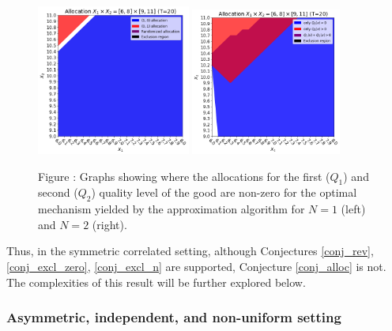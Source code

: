 \documentclass{article}
\newcounter{fig}
\begin{document}
\begin{figure}[H]
    \begin{center}
    \includegraphics[width=0.45\textwidth]{images/belloni_alloc_n1.png}
    \includegraphics[width=0.44\textwidth]{images/belloni_alloc_n2.png}
    \end{center}
    
    \vspace{1mm}
    \raggedright{\small {\sc Figure \thefig\label{fig:belloni_alloc_alln}:} Graphs showing where the allocations for the first ($Q_1$) and second ($Q_2$) quality level of the good are non-zero for the optimal mechanism yielded by the approximation algorithm for $N=1$ (left) and $N=2$ (right).} 
\end{figure}

Thus, in the symmetric correlated setting, although Conjectures \ref{conj_rev}, \ref{conj_excl_zero}, \ref{conj_excl_n} are supported, Conjecture \ref{conj_alloc} is not. The complexities of this result will be further explored below.







\subsubsection{Asymmetric, independent, and non-uniform setting}
\end{document}
